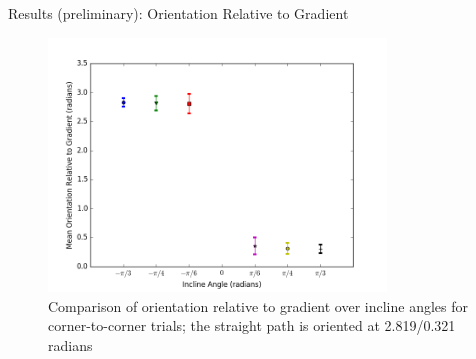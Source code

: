 \begin{frame}{Results (preliminary): Orientation Relative to Gradient}
\begin{figure}
\includegraphics[width=0.8\textwidth]{results/corner-to-cornermeanorientationrelativetogradient.png}
\caption{Comparison of orientation relative to gradient over incline angles for corner-to-corner trials; the straight path is oriented at 2.819/0.321 radians}
\end{figure}
\end{frame}

